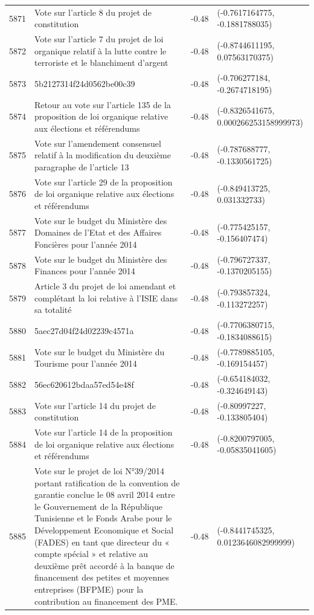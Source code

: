 \begin{table}[ht]
\begin{tabular}{rlrl}
  5871 & Vote sur l'article 8 du projet de constitution & -0.48 & (-0.7617164775, -0.1881788035) \\ 
  5872 & Vote sur l'article 7 du projet de loi organique relatif à la lutte contre le terroriste et le blanchiment d'argent & -0.48 & (-0.8744611195, 0.07563170375) \\ 
  5873 & 5b2127314f24d0562be00c39 & -0.48 & (-0.706277184, -0.2674718195) \\ 
  5874 & Retour au vote sur l'article 135 de la proposition de loi organique relative aux élections et référendums & -0.48 & (-0.8326541675, 0.000266253158999973) \\ 
  5875 & Vote sur l'amendement consensuel relatif à la modification du deuxième paragraphe de l'article 13 & -0.48 & (-0.787688777, -0.1330561725) \\ 
  5876 & Vote sur l'article 29 de la proposition de loi organique relative aux élections et référendums & -0.48 & (-0.849413725, 0.031332733) \\ 
  5877 & Vote sur le budget du Ministère des Domaines de l'Etat et des Affaires Foncières pour l'année 2014 & -0.48 & (-0.775425157, -0.156407474) \\ 
  5878 & Vote sur le budget du Ministère des Finances pour l'année 2014 & -0.48 & (-0.796727337, -0.1370205155) \\ 
  5879 & Article 3 du projet de loi amendant et complétant la loi relative à l'ISIE dans sa totalité & -0.48 & (-0.793857324, -0.113272257) \\ 
  5880 & 5aec27d04f24d02239c4571a & -0.48 & (-0.7706380715, -0.1834088615) \\ 
  5881 & Vote sur le budget du Ministère du Tourisme pour l'année 2014 & -0.48 & (-0.7789885105, -0.169154457) \\ 
  5882 & 56ec620612bdaa57ed54e48f & -0.48 & (-0.654184032, -0.324649143) \\ 
  5883 & Vote sur l'article 14 du projet de constitution & -0.48 & (-0.80997227, -0.133805404) \\ 
  5884 & Vote sur l'article 14 de la proposition de loi organique relative aux élections et référendums & -0.48 & (-0.8200797005, -0.05835041605) \\ 
  5885 & Vote sur le projet de loi N°39/2014 portant ratification de la convention de garantie conclue le 08 avril 2014 entre le Gouvernement de la République Tunisienne et le Fonds Arabe pour le Développement Economique et Social (FADES) en tant que directeur du « compte spécial » et relative au deuxième prêt accordé à la banque de financement des petites et moyennes entreprises (BFPME) pour la contribution au financement des PME. & -0.48 & (-0.8441745325, 0.0123646082999999) \\ 

\end{tabular}
\end{table}
